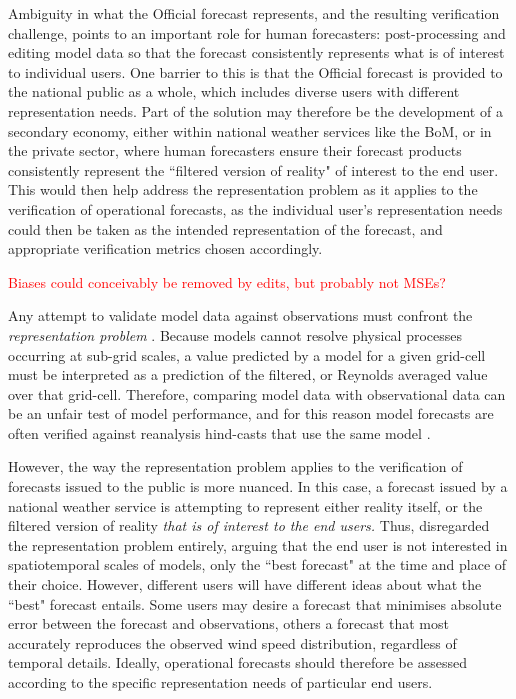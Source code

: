 \documentclass{article}
\begin{document}
Ambiguity in what the Official forecast represents, and the resulting verification challenge, points to an important role for human forecasters: post-processing and editing model data so that the forecast consistently represents what is of interest to individual users. One barrier to this is that the Official forecast is provided to the national public as a whole, which includes diverse users with different representation needs. Part of the solution may therefore be the development of a secondary economy, either within national weather services like the BoM, or in the private sector, where human forecasters ensure their forecast products consistently represent the ``filtered version of reality" of interest to the end user. This would then help address the representation problem as it applies to the verification of operational forecasts, as the individual user's representation needs could then be taken as the intended representation of the forecast, and appropriate verification metrics chosen accordingly.    

\textcolor{red}{Biases could conceivably be removed by edits, but probably not MSEs?}

Any attempt to validate model data against observations must confront the \textit{representation problem} \citep[e.g.][]{zaron06}. Because models cannot resolve physical processes occurring at sub-grid scales, a value predicted by a model for a given grid-cell must be interpreted as a prediction of the filtered, or Reynolds averaged value over that grid-cell. Therefore, comparing model data with observational data can be an unfair test of model performance, and for this reason model forecasts are often verified against reanalysis hind-casts that use the same model \citep[e.g.][]{lynch14}.

However, the way the representation problem applies to the verification of forecasts issued to the public is more nuanced. In this case, a forecast issued by a national weather service is attempting to represent either reality itself, or the filtered version of reality \textit{that is of interest to the end users.} Thus, \citet{pinson12} disregarded the representation problem entirely, arguing that the end user is not interested in spatiotemporal scales of models, only the ``best forecast" at the time and place of their choice. However, different users will have different ideas about what the ``best" forecast entails. Some users may desire a forecast that minimises absolute error between the forecast and observations, others a forecast that most accurately reproduces the observed wind speed distribution, regardless of temporal details. Ideally, operational forecasts should therefore be assessed according to the specific representation needs of particular end users. 
\end{document}
